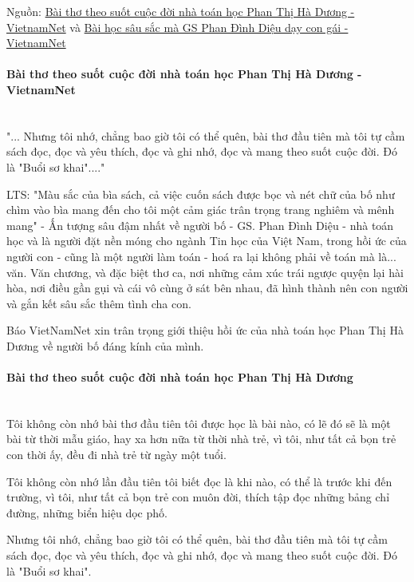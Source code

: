 Nguồn: \href{https://vietnamnet.vn/vn/giao-duc/nguoi-thay/gs-phan-dinh-dieu-qua-hoi-uc-cua-con-gai-710146.html}{Bài thơ theo suốt cuộc đời nhà toán học Phan Thị Hà Dương - VietnamNet} và \href{https://vietnamnet.vn/vn/giao-duc/nguoi-thay/gs-phan-dinh-dieu-day-con-710149.html}{Bài học sâu sắc mà GS Phan Đình Diệu dạy con gái - VietnamNet}

\paragraph{Bài thơ theo suốt cuộc đời nhà toán học Phan Thị Hà Dương - VietnamNet} \ \\

"... Nhưng tôi nhớ, chẳng bao giờ tôi có thể quên, bài thơ đầu tiên mà tôi tự cầm sách đọc, đọc và yêu thích, đọc và ghi nhớ, đọc và mang theo suốt cuộc đời. Đó là "Buổi sơ khai"...."

LTS: "Màu sắc của bìa sách, cả việc cuốn sách được bọc và nét chữ của bố như chìm vào bìa mang đến cho tôi một cảm giác trân trọng trang nghiêm và mênh mang" - Ấn tượng sâu đậm nhất về người bố - GS. Phan Đình Diệu - nhà toán học và là người đặt nền móng cho ngành Tin học của Việt Nam, trong hồi ức của người con - cũng là một người làm toán - hoá ra lại không phải về toán mà là... văn. Văn chương, và đặc biệt thơ ca, nơi những cảm xúc trái ngược quyện lại hài hòa, nơi điều gần gụi và cái vô cùng ở sát bên nhau, đã hình thành nên con người và gắn kết sâu sắc thêm tình cha con. 

Báo VietNamNet xin trân trọng giới thiệu hồi ức của nhà toán học Phan Thị Hà Dương về người bố đáng kính của mình.

\paragraph{Bài thơ theo suốt cuộc đời nhà toán học Phan Thị Hà Dương} \ \\

Tôi không còn nhớ bài thơ đầu tiên tôi được học là bài nào, có lẽ đó sẽ là một bài từ thời mẫu giáo, hay xa hơn nữa từ thời nhà trẻ, vì tôi, như tất cả bọn trẻ con thời ấy, đều đi nhà trẻ từ ngày một tuổi.

Tôi không còn nhớ lần đầu tiên tôi biết đọc là khi nào, có thể là trước khi đến trường, vì tôi, như tất cả bọn trẻ con muôn đời, thích tập đọc những bảng chỉ đường, những biển hiệu dọc phố.

Nhưng tôi nhớ, chẳng bao giờ tôi có thể quên, bài thơ đầu tiên mà tôi tự cầm sách đọc, đọc và yêu thích, đọc và ghi nhớ, đọc và mang theo suốt cuộc đời. Đó là "Buổi sơ khai".

